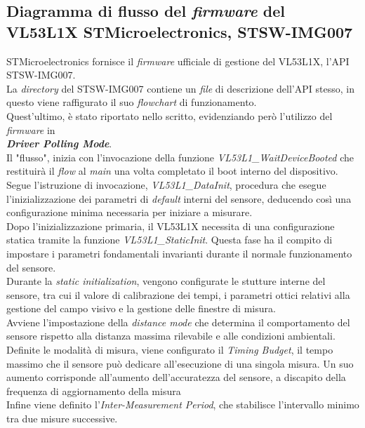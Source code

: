 \documentclass[11pt]{report}
\begin{document}
\subsection{Diagramma di flusso del \textit{firmware} del VL53L1X STMicroelectronics, STSW-IMG007}
STMicroelectronics fornisce il \textit{firmware} ufficiale di gestione del VL53L1X, l'API \\
STSW-IMG007.\\
La \textit{directory} del STSW-IMG007 contiene un \textit{file} di descrizione dell'API stesso, in questo viene raffigurato il suo \textit{flowchart} di funzionamento.\\
Quest'ultimo, è stato riportato nello scritto, evidenziando però l'utilizzo del \textit{firmware} in\\\textbf{\textit{Driver Polling Mode}}.\\
Il "flusso", inizia con l'invocazione della funzione \textit{VL53L1\_WaitDeviceBooted} che restituirà il \textit{flow} al \textit{main} una volta completato il boot interno del dispositivo.\\
Segue l'istruzione di invocazione, \textit{VL53L1\_DataInit}, procedura che esegue l'inizializzazione dei parametri di \textit{default} interni del sensore, deducendo così una configurazione minima necessaria per iniziare a misurare.\\
Dopo l'inizializzazione primaria, il VL53L1X necessita di una configurazione statica tramite la funzione \textit{VL53L1\_StaticInit}. Questa fase ha il compito di impostare i parametri fondamentali invarianti durante il normale funzionamento del sensore.\\
Durante la \textit{static initialization}, vengono configurate le stutture interne del sensore, tra cui il valore di calibrazione dei tempi, i parametri ottici relativi alla gestione del campo visivo e la gestione delle finestre di misura.\\
Avviene l'impostazione della \textit{distance mode} che determina il comportamento del sensore rispetto alla distanza massima rilevabile e alle condizioni ambientali.\\
Definite le modalità di misura, viene configurato il \textit{Timing Budget}, il tempo massimo che il sensore può dedicare all'esecuzione di una singola misura. Un suo aumento corrisponde all'aumento dell'accuratezza del sensore, a discapito della frequenza di aggiornamento della misura\\
Infine viene definito l'\textit{Inter-Measurement Period}, che stabilisce l'intervallo minimo tra due misure successive.\\
\end{document}
